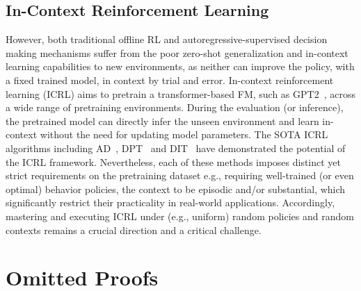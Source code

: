 \documentclass[10pt]{article}
\begin{document}
\subsection{In-Context Reinforcement Learning}
However, both traditional offline RL and autoregressive-supervised decision making mechanisms suffer from the poor zero-shot generalization and in-context learning capabilities to new environments, as neither can improve the policy, with a fixed trained model, in context by trial and error. In-context reinforcement learning (ICRL) aims to pretrain a transformer-based FM, such as GPT2~\citep{radford2019language}, across a wide range of pretraining environments. During the evaluation (or inference), the pretrained model can directly infer the unseen environment and learn in-context without the need for updating model parameters.
The SOTA ICRL algorithms including AD~\citep{laskin2022context}, DPT~\citep{lee2024supervised} and DIT~\citep{dong2024context} have demonstrated the potential of the ICRL framework. Nevertheless, each of these methods imposes distinct yet strict requirements on the pretraining dataset e.g., requiring well-trained (or even optimal) behavior policies, the context to be episodic and/or substantial, which significantly restrict their practicality in real-world applications.
Accordingly, mastering and executing ICRL under (e.g., uniform) random policies and random contexts remains a crucial direction and a critical challenge.
\section{Omitted Proofs}
\label{appendix_omit_proof}
\end{document}
